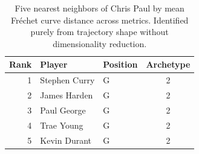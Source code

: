 \begin{table}[htbp]
  \centering\small
  \begin{tabular}{rllc}
    \toprule
    Rank & Player & Position & Archetype \\
    \midrule
    1 & Stephen Curry & G & 2 \\
    2 & James Harden & G & 2 \\
    3 & Paul George & G & 2 \\
    4 & Trae Young & G & 2 \\
    5 & Kevin Durant & G & 2 \\
    \bottomrule
  \end{tabular}
  \caption{Five nearest neighbors of Chris Paul by mean Fr\'{e}chet curve distance across metrics. Identified purely from trajectory shape without dimensionality reduction.}
  \label{tab:Chris_Paul_frechet_curve_neighbors}
\end{table}

